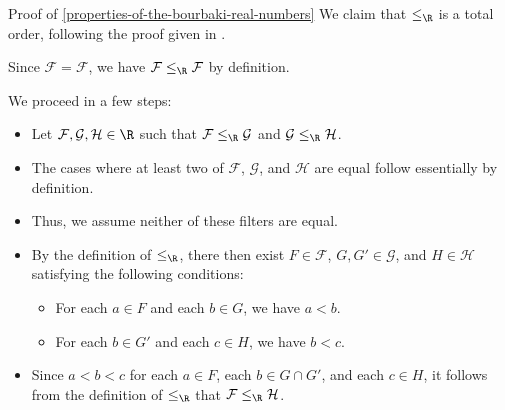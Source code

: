 \begin{Proof}{Proof of \cref{properties-of-the-bourbaki-real-numbers}}%
    We claim that $\leq_{\R}$ is a total order, following the proof given in \cite[Theorem 4.6]{weiss:the-reals-as-rational-cauchy-filters}.

    Since $\mathcal{F}=\mathcal{F}$, we have $\mathcal{F}\leq_{\R}\mathcal{F}$ by definition.

    We proceed in a few steps:
    \begin{itemize}
        \item Let $\mathcal{F},\mathcal{G},\mathcal{H}\in\R$ such that $\mathcal{F}\leq_{\R}\mathcal{G}$ and $\mathcal{G}\leq_{\R}\mathcal{H}$.
        \item The cases where at least two of $\mathcal{F}$, $\mathcal{G}$, and $\mathcal{H}$ are equal follow essentially by definition.
        \item Thus, we assume neither of these filters are equal.
        \item By the definition of $\leq_{\R}$, there then exist $F\in\mathcal{F}$, $G,G'\in\mathcal{G}$, and $H\in\mathcal{H}$ satisfying the following conditions:
            \begin{itemize}
                \item For each $a\in F$ and each $b\in G$, we have $a\less b$.
                \item For each $b\in G'$ and each $c\in H$, we have $b\less c$.
            \end{itemize}
        \item Since $a\less b\less c$ for each $a\in F$, each $b\in G\cap G'$, and each $c\in H$, it follows from the definition of $\leq_{\R}$ that $\mathcal{F}\leq_{\R}\mathcal{H}$.
    \end{itemize}


\end{Proof}
